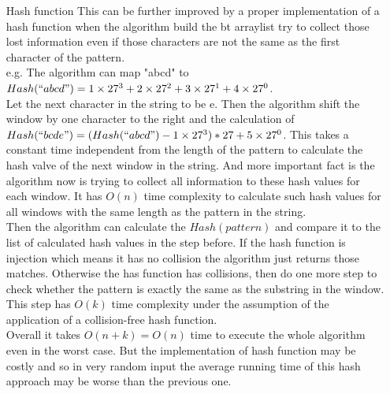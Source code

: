 \documentclass[10pt,twoside,a4paper]{article}
\begin{document}
\begin{itemize}
\item[Hash function]
This can be further improved by a proper implementation of a hash function when the algorithm build the bt arraylist try to collect those lost information even if those characters are not the same as the first character of the pattern.
\\e.g. The algorithm can map "abcd" to $Hash(``abcd")=1\times27^3+2\times27^2+3\times27^1+4\times27^0$.
\\Let the next character in the string to be e. Then the algorithm shift the window by one character to the right and the calculation of $Hash(``bcde")=(Hash(``abcd")-1\times27^3)*27+5\times27^0$. This takes a constant time independent from the length of the pattern to calculate the hash valve of the next window in the string. And more important fact is the algorithm now is trying to collect all information to these hash values for each window. It has $O(n)$ time complexity to calculate such hash values for all windows with the same length as the pattern in the string.
\\Then the algorithm can calculate the $Hash(pattern)$ and compare it to the list of calculated hash values in the step before. If the hash function is injection which means it has no collision the algorithm just returns those matches. Otherwise the has function has collisions, then do one more step to check whether the pattern is exactly the same as the substring in the window. This step has $O(k)$ time complexity under the assumption of the application of a collision-free hash function.
\\Overall it takes $O(n+k)=O(n)$ time to execute the whole algorithm even in the worst case. But the implementation of hash function may be costly and so in very random input the average running time of this hash approach may be worse than the previous one.
\end{itemize}
\end{document}
